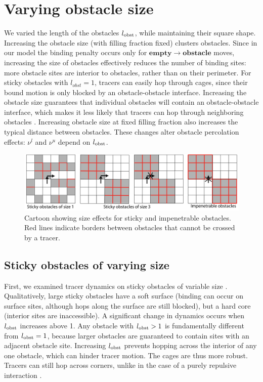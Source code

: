 \section{Varying obstacle size}

We varied the length of the obstacles $l_{\rm obst}$, while maintaining their
square shape.  Increasing the obstacle size (with filling fraction fixed)
clusters obstacles.  Since in our model the binding penalty occurs only for $
\mathbf {empty} \rightarrow \mathbf {obstacle} $ moves, increasing the size of
obstacles effectively reduces the number of binding sites: more obstacle sites
are interior to obstacles, rather than on their perimeter.  For sticky obstacles
with $l_{obst} = 1$, tracers can easily hop through cages, since their bound
motion is only blocked by an obstacle-obstacle interface.  Increasing the
obstacle size guarantees that individual obstacles will contain an
obstacle-obstacle interface, which makes it less likely that tracers can hop
through neighboring obstacles .  Increasing obstacle
size at fixed filling fraction also increases the typical distance between
obstacles. These changes alter obstacle percolation effects: $\nu^l$ and $\nu^u$
depend on $l_{\rm obst}$.

\begin{figure}[b]
  \begin{center}
	  \includegraphics[width=150mm]{figs/ch02_soft/soft_size_moves.png}
  \end{center}
	\caption[Size effects cartoon]
    {Cartoon showing size effects for sticky and impenetrable
    obstacles. Red lines indicate borders between obstacles that
    cannot be crossed by a tracer.}\label{fig:size_moves}
\end{figure}

\subsection{Sticky obstacles of varying size} First, we examined tracer dynamics
on sticky obstacles of variable size .  Qualitatively,
large sticky obstacles have a soft surface (binding can occur on surface sites,
although hops along the surface are still blocked), but a hard core (interior
sites are inaccessible).  A significant change in dynamics occurs when $ l_{\rm
  obst}$ increases above 1. Any obstacle with $l_{\rm obst} > 1$ is
fundamentally different from $l_{\rm obst} = 1$, because larger obstacles are
guaranteed to contain sites with an adjacent obstacle site. Increasing $l_{\rm
  obst}$ prevents hopping across the interior of any one obstacle, which can
hinder tracer motion. The cages are thus more robust.  Tracers can still hop
across corners, unlike in the case of a purely repulsive interaction
.


